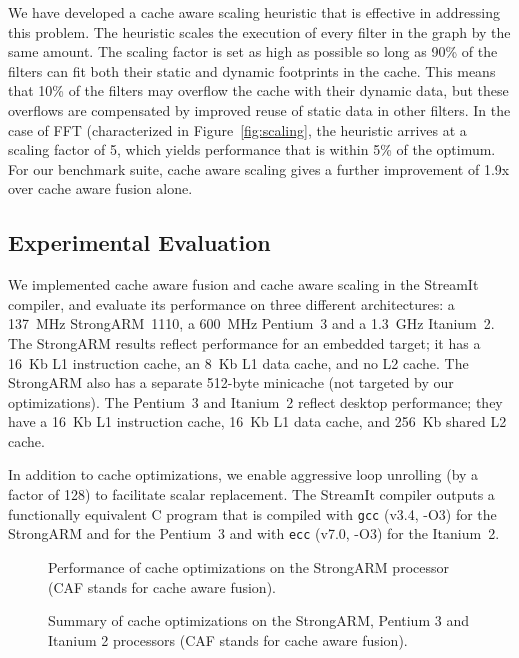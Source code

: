 We have developed a cache aware scaling heuristic that is effective in
addressing this problem.  The heuristic scales the execution of every
filter in the graph by the same amount.  The scaling factor is set as
high as possible so long as 90\% of the filters can fit both their
static and dynamic footprints in the cache.  This means that 10\% of
the filters may overflow the cache with their dynamic data, but these
overflows are compensated by improved reuse of static data in other
filters.  In the case of FFT (characterized in
Figure~\ref{fig:scaling}, the heuristic arrives at a scaling factor of
5, which yields performance that is within 5\% of the optimum.  For our
benchmark suite, cache aware scaling gives a further improvement of
1.9x over cache aware fusion alone.

\subsection*{Experimental Evaluation}

We implemented cache aware fusion and cache aware scaling in the
StreamIt compiler, and evaluate its performance on three different
architectures: a 137~MHz StrongARM~1110, a 600~MHz Pentium~3 and a
1.3~GHz Itanium~2. The StrongARM results reflect performance for an
embedded target; it has a 16~Kb L1 instruction cache, an 8~Kb L1 data
cache, and no L2 cache.  The StrongARM also has a separate 512-byte
minicache (not targeted by our optimizations).  The Pentium~3 and
Itanium~2 reflect desktop performance; they have a 16~Kb L1
instruction cache, 16~Kb L1 data cache, and 256~Kb shared L2 cache.

In addition to cache optimizations, we enable aggressive loop
unrolling (by a factor of 128) to facilitate scalar replacement.  The
StreamIt compiler outputs a functionally equivalent C program that is
compiled with \texttt{gcc} (v3.4, -O3) for the StrongARM and for the
Pentium~3 and with \texttt{ecc} (v7.0, -O3) for the Itanium~2.

\begin{figure}[t]
\centering
{}
\caption[Performance of cache optimizations on the StrongARM]{Performance 
of cache optimizations on the StrongARM processor (CAF stands for
cache aware fusion).\protect\label{fig:arm}}
\end{figure}

\begin{figure}[t]
\centering
{}
\caption[Summary of cache optimizations on the StrongARM, Pentium 3 and 
Itanium 2]{Summary of cache optimizations on the StrongARM, Pentium 3
and Itanium 2 processors (CAF stands for cache aware
fusion).\protect\label{fig:p3}}
\end{figure}

